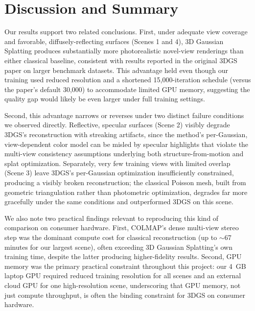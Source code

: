 \documentclass[conference]{IEEEtran}
\begin{document}
\section{Discussion and Summary}
\label{sec:discussion}

Our results support two related conclusions. First, under adequate view coverage and favorable, diffusely-reflecting surfaces (Scenes 1 and 4), 3D Gaussian Splatting produces substantially more photorealistic novel-view renderings than either classical baseline, consistent with results reported in the original 3DGS paper on larger benchmark datasets. This advantage held even though our training used reduced resolution and a shortened 15,000-iteration schedule (versus the paper's default 30,000) to accommodate limited GPU memory, suggesting the quality gap would likely be even larger under full training settings.

Second, this advantage narrows or reverses under two distinct failure conditions we observed directly. Reflective, specular surfaces (Scene 2) visibly degrade 3DGS's reconstruction with streaking artifacts, since the method's per-Gaussian, view-dependent color model can be misled by specular highlights that violate the multi-view consistency assumptions underlying both structure-from-motion and splat optimization. Separately, very few training views with limited overlap (Scene 3) leave 3DGS's per-Gaussian optimization insufficiently constrained, producing a visibly broken reconstruction; the classical Poisson mesh, built from geometric triangulation rather than photometric optimization, degrades far more gracefully under the same conditions and outperformed 3DGS on this scene.

We also note two practical findings relevant to reproducing this kind of comparison on consumer hardware. First, COLMAP's dense multi-view stereo step was the dominant compute cost for classical reconstruction (up to $\sim$67 minutes for our largest scene), often exceeding 3D Gaussian Splatting's own training time, despite the latter producing higher-fidelity results. Second, GPU memory was the primary practical constraint throughout this project: our 4~GB laptop GPU required reduced training resolution for all scenes and an external cloud GPU for one high-resolution scene, underscoring that GPU memory, not just compute throughput, is often the binding constraint for 3DGS on consumer hardware.
\end{document}
